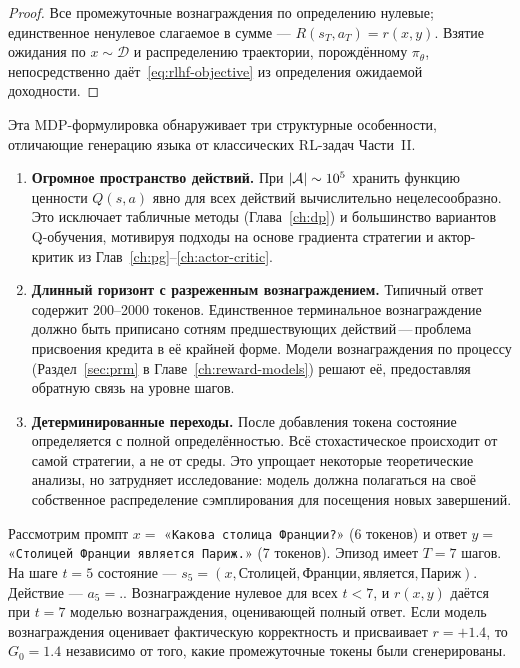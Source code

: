 \begin{proof}
Все промежуточные вознаграждения по определению нулевые; единственное ненулевое слагаемое в сумме --- $R(s_T, a_T) = r(x, y)$. Взятие ожидания по $x \sim \mathcal{D}$ и распределению траектории, порождённому $\pi_\theta$, непосредственно даёт~\eqref{eq:rlhf-objective} из определения ожидаемой доходности.
\end{proof}

Эта MDP-формулировка обнаруживает три структурные особенности, отличающие генерацию языка от классических RL-задач Части~II.

\begin{remark}
\label{rem:lm-mdp-features}
\begin{enumerate}[leftmargin=*]
  \item \textbf{Огромное пространство действий.} При $|\mathcal{A}| \sim 10^5$ хранить функцию ценности $Q(s, a)$ явно для всех действий вычислительно нецелесообразно. Это исключает табличные методы (Глава~\ref{ch:dp}) и большинство вариантов Q-обучения, мотивируя подходы на основе градиента стратегии и актор-критик из Глав~\ref{ch:pg}--\ref{ch:actor-critic}.
  \item \textbf{Длинный горизонт с разреженным вознаграждением.} Типичный ответ содержит 200--2000 токенов. Единственное терминальное вознаграждение должно быть приписано сотням предшествующих действий\,---\,проблема присвоения кредита в её крайней форме. Модели вознаграждения по процессу (Раздел~\ref{sec:prm} в Главе~\ref{ch:reward-models}) решают её, предоставляя обратную связь на уровне шагов.
  \item \textbf{Детерминированные переходы.} После добавления токена состояние определяется с полной определённостью. Всё стохастическое происходит от самой стратегии, а не от среды. Это упрощает некоторые теоретические анализы, но затрудняет исследование: модель должна полагаться на своё собственное распределение сэмплирования для посещения новых завершений.
\end{enumerate}
\end{remark}

\begin{example}
\label{ex:token-mdp-example}
Рассмотрим промпт $x = $ «\texttt{Какова столица Франции?}» (6 токенов) и ответ $y = $ «\texttt{Столицей Франции является Париж.}» (7 токенов). Эпизод имеет $T = 7$ шагов. На шаге $t = 5$ состояние --- $s_5 = (x, \texttt{Столицей}, \texttt{Франции}, \texttt{является}, \texttt{Париж})$. Действие --- $a_5 = \texttt{.}$. Вознаграждение нулевое для всех $t < 7$, и $r(x, y)$ даётся при $t = 7$ моделью вознаграждения, оценивающей полный ответ. Если модель вознаграждения оценивает фактическую корректность и присваивает $r = +1.4$, то $G_0 = 1.4$ независимо от того, какие промежуточные токены были сгенерированы.
\end{example}

